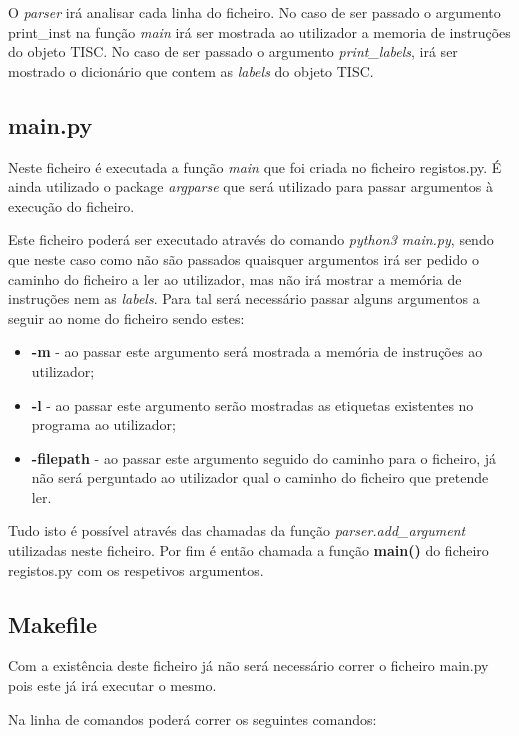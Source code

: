\documentclass[titlepage,11pt,svgnames]{article}   %
\begin{document}
O \textit{parser} irá analisar cada linha do ficheiro. No caso de ser passado o argumento print\_inst na função \textit{main} irá ser mostrada ao utilizador a memoria de instruções do objeto TISC. No caso de ser passado o argumento \textit{print\_labels}, irá ser mostrado o dicionário que contem as \textit{labels} do objeto TISC.

\subsection{main.py}

Neste ficheiro é executada a função \textit{main} que foi criada no ficheiro registos.py. É ainda utilizado o package \textit{argparse} que será utilizado para passar argumentos à execução do ficheiro.

Este ficheiro poderá ser executado através do comando \textit{python3 main.py}, sendo que neste caso como não são passados quaisquer argumentos irá ser pedido o caminho do ficheiro a ler ao utilizador, mas não irá mostrar a memória de instruções nem as \textit{labels}. Para tal será necessário passar alguns argumentos a seguir ao nome do ficheiro sendo estes:

\begin{itemize}
\item \textbf{-m} - ao passar este argumento será mostrada a memória de instruções ao utilizador;
\item \textbf{-l} - ao passar este argumento serão mostradas as etiquetas existentes no programa ao utilizador;
\item \textbf{-filepath} - ao passar este argumento seguido do caminho para o ficheiro, já não será perguntado ao utilizador qual o caminho do ficheiro que pretende ler.
\end{itemize}

Tudo isto é possível através das chamadas da função \textit{parser.add\_argument} utilizadas neste ficheiro. Por fim é então chamada a função \textbf{main()} do ficheiro registos.py com os respetivos argumentos.

\subsection{Makefile}

Com a existência deste ficheiro já não será necessário correr o ficheiro main.py pois este já irá executar o mesmo.

Na linha de comandos poderá correr os seguintes comandos:
\end{document}
